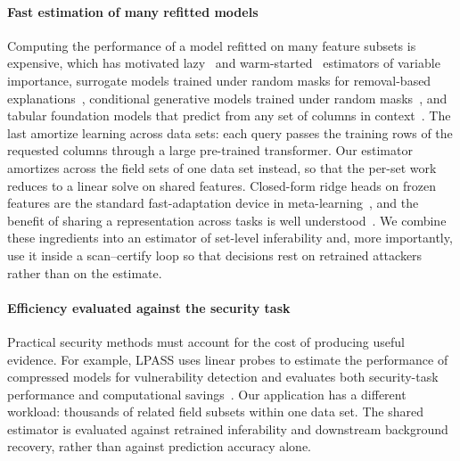\paragraph{Fast estimation of many refitted models}
Computing the performance of a model refitted on many feature subsets is expensive, which has
motivated lazy~\cite{gao2022lazyvi} and warm-started~\cite{sun2025warmstart} estimators of
variable importance, surrogate models trained under random masks for removal-based
explanations~\cite{covert2021explaining,jethani2022fastshap,covert2023vitshapley}, conditional generative models trained under
random masks~\cite{ivanov2019vaeac,li2020acflow,yoon2020vime,he2022mae}, and tabular foundation models that predict from any
set of columns in context~\cite{hollmann2025tabpfn}. The last amortize learning across data sets: each query passes the
training rows of the requested columns through a large pre-trained transformer. Our estimator amortizes across the field
sets of one data set instead, so that the per-set work reduces to a linear solve on shared features.
Closed-form ridge heads on frozen features are the standard fast-adaptation device in
meta-learning~\cite{bertinetto2019r2d2,lee2019metaoptnet}, and the benefit of sharing a
representation across tasks is well understood~\cite{caruana1997multitask,baxter2000inductive,maurer2016benefit}.
We combine these ingredients into an estimator of set-level inferability and, more
importantly, use it inside a scan--certify loop so that decisions rest on retrained
attackers rather than on the estimate.


\paragraph{Efficiency evaluated against the security task}
Practical security methods must account for the cost of producing useful evidence. For example, LPASS uses linear probes to estimate the performance of compressed models for vulnerability detection and evaluates both security-task performance and computational savings~\cite{ibanez2025lpass}. Our application has a different workload: thousands of related field subsets within one data set. The shared estimator is evaluated against retrained inferability and downstream background recovery, rather than against prediction accuracy alone.
